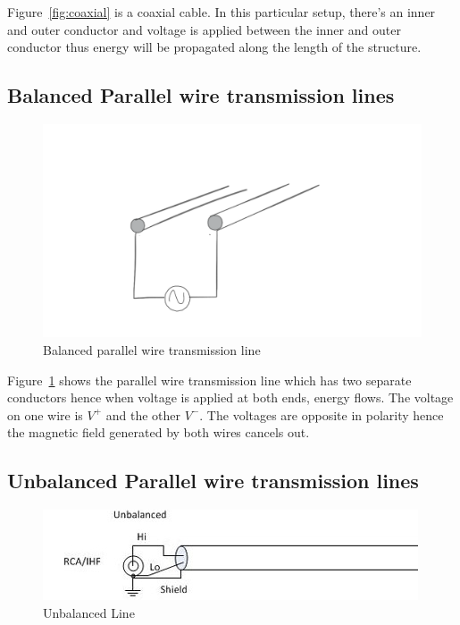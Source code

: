 Figure~\ref{fig:coaxial} is a coaxial cable. In this particular setup, there’s an inner and outer conductor and voltage is applied between the inner and outer conductor thus energy will be propagated along the length of the structure.

\subsection{Balanced Parallel wire transmission lines}
\begin{figure}[h]
\centering
\includegraphics[width=1\linewidth]{./graphics/parallel_wire_tx_simp_temp}
\caption{Balanced parallel wire transmission line}
\label{fig:twowire}
\end{figure}

Figure~\ref{fig:twowire} shows the parallel wire transmission line which has two separate conductors hence when voltage is applied at both ends, energy flows. The voltage on one wire is $V^+$ and the other $V^-$. The voltages are opposite in polarity hence the magnetic field generated by both wires cancels out.

\subsection{Unbalanced Parallel wire transmission lines}
\begin{figure}[h]
\centering
\includegraphics[width=1\linewidth]{./graphics/unbalanced}
\caption{Unbalanced Line}
\label{fig:unbalanced}
\end{figure}

